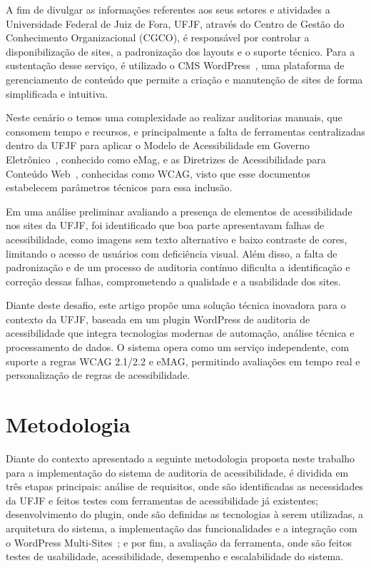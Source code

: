 \documentclass[
	article,			%
	12pt,				%
	oneside,			%
	a4paper,			%
	section=TITLE,		%
	subsection=TITLE,	%
	english,			%
	brazil,				%
	sumario=tradicional
	]{abntex2}
\begin{document}
A fim de divulgar as informações referentes aos seus setores e atividades a
Universidade Federal de Juiz de Fora, UFJF, através do Centro de Gestão
do Conhecimento Organizacional (CGCO), é responsável por controlar a
disponibilização de sites, a padronização dos layouts e o suporte técnico. Para
a sustentação desse serviço, é utilizado o CMS WordPress~\cite{WP},
uma plataforma de gerenciamento de conteúdo que permite a criação e
manutenção de sites de forma simplificada e intuitiva.

Neste cenário o temos uma complexidade ao realizar auditorias manuais, que
consomem tempo e recursos, e principalmente a falta de ferramentas
centralizadas dentro da UFJF para aplicar o Modelo de Acessibilidade em
Governo Eletrônico~\cite{emag}, conhecido como eMag, e as Diretrizes
de Acessibilidade para Conteúdo Web~\cite{wcag22}, conhecidas como
WCAG, visto que esse documentos estabelecem parâmetros técnicos para essa inclusão.

Em uma análise preliminar avaliando a presença de elementos de acessibilidade nos
sites da UFJF, foi identificado que boa parte apresentavam falhas de acessibilidade, como imagens sem texto
alternativo e baixo contraste de cores, limitando o acesso de usuários com deficiência
visual. Além disso, a falta de padronização e de um processo de auditoria contínuo
dificulta a identificação e correção dessas falhas, comprometendo a qualidade e a
usabilidade dos sites.

Diante deste desafio, este artigo propõe uma solução técnica inovadora
para o contexto da UFJF, baseada em um plugin WordPress de auditoria
de acessibilidade que integra tecnologias modernas de automação,
análise técnica e processamento de dados. O sistema opera como um serviço
independente, com suporte a regras WCAG 2.1/2.2 e eMAG, permitindo
avaliações em tempo real e personalização de regras de acessibilidade.

\section{Metodologia}\label{sec:metodologia}
Diante do contexto apresentado a seguinte metodologia proposta neste trabalho
para a implementação do sistema de auditoria de acessibilidade, é dividida
em três etapas principais: análise de requisitos, onde são identificadas as
necessidades da UFJF e feitos testes com ferramentas de acessibilidade já
existentes; desenvolvimento do plugin, onde são definidas as tecnologias à serem
utilizadas, a arquitetura do sistema, a implementação das funcionalidades e a
integração com o WordPress Multi-Sites~\cite{wp-ms}; e por fim,
a avaliação da ferramenta,
onde são feitos testes de usabilidade, acessibilidade, desempenho e
escalabilidade do sistema.
\end{document}
